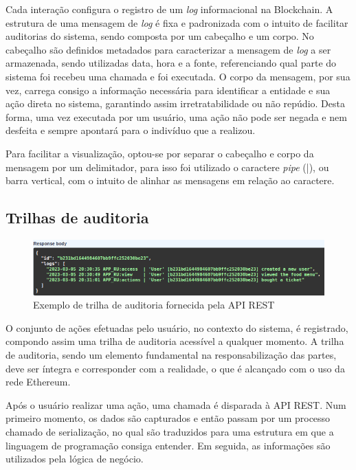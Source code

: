 Cada interação configura o registro de um \emph{log} informacional na Blockchain. A estrutura de uma mensagem de \emph{log} é fixa e padronizada com o intuito de facilitar auditorias do sistema, sendo composta por um cabeçalho e um corpo. No cabeçalho são definidos metadados para caracterizar a mensagem de \emph{log} a ser armazenada, sendo utilizadas data, hora e a fonte, referenciando qual parte do sistema foi recebeu uma chamada e foi executada. O corpo da mensagem, por sua vez, carrega consigo a informação necessária para identificar a entidade e sua ação direta no sistema, garantindo assim irretratabilidade ou não repúdio. Desta forma, uma vez executada por um usuário, uma ação não pode ser negada e nem desfeita e sempre apontará para o indivíduo que a realizou.

Para facilitar a visualização, optou-se por separar o cabeçalho e corpo da mensagem por um delimitador, para isso foi utilizado o caractere \emph{pipe} (|), ou barra vertical, com o intuito de alinhar as mensagens em relação ao caractere.

\subsection{Trilhas de auditoria}
\begin{figure}
    \centering
    \includegraphics[width=1\textwidth]{img/Cap3/Trilha de auditoria.png}
    \caption{Exemplo de trilha de auditoria fornecida pela API REST}
    \label{fig:trilha_auditoria}
\end{figure}

O conjunto de ações efetuadas pelo usuário, no contexto do sistema, é registrado, compondo assim uma trilha de auditoria acessível a qualquer momento. A trilha de auditoria, sendo um elemento fundamental na responsabilização das partes, deve ser íntegra e corresponder com a realidade, o que é alcançado com o uso da rede Ethereum.

Após o usuário realizar uma ação, uma chamada é disparada à API REST. Num primeiro momento, os dados são capturados e então passam por um processo chamado de serialização, no qual são traduzidos para uma estrutura em que a linguagem de programação consiga entender. Em seguida, as informações são utilizados pela lógica de negócio. 

